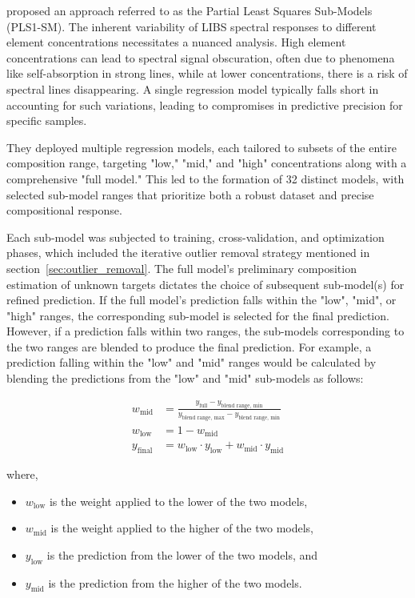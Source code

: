\citet{andersonImprovedAccuracyQuantitative2017} proposed an approach referred to as the Partial Least Squares Sub-Models (PLS1-SM).
The inherent variability of LIBS spectral responses to different element concentrations necessitates a nuanced analysis.
High element concentrations can lead to spectral signal obscuration, often due to phenomena like self-absorption in strong lines, while at lower concentrations, there is a risk of spectral lines disappearing.
A single regression model typically falls short in accounting for such variations, leading to compromises in predictive precision for specific samples.

They deployed multiple regression models, each tailored to subsets of the entire composition range, targeting "low," "mid," and "high" concentrations along with a comprehensive "full model." This led to the formation of 32 distinct models, with selected sub-model ranges that prioritize both a robust dataset and precise compositional response.

Each sub-model was subjected to training, cross-validation, and optimization phases, which included the iterative outlier removal strategy mentioned in section~\ref{sec:outlier_removal}.
The full model's preliminary composition estimation of unknown targets dictates the choice of subsequent sub-model(s) for refined prediction.
If the full model's prediction falls within the "low", "mid", or "high" ranges, the corresponding sub-model is selected for the final prediction.
However, if a prediction falls within two ranges, the sub-models corresponding to the two ranges are blended to produce the final prediction.
For example, a prediction falling within the "low" and "mid" ranges would be calculated by blending the predictions from the "low" and "mid" sub-models as follows:

\begin{align*}
w_{\text{mid}} &= \frac{y_{\text{full}}-y_{\text{blend range, min}}}{y_{\text{blend range, max}} - y_{\text{blend range, min}}} \\
w_{\text{low}} &= 1 - w_{\text{mid}} \\
y_{\text{final}} &= w_{\text{low}}\cdot y_{\text{low}} + w_{\text{mid}}\cdot y_{\text{mid}}
\end{align*}

where,

\begin{itemize}
    \item $w_{\text{low}}$ is the weight applied to the lower of the two models,
    \item $w_{\text{mid}}$ is the weight applied to the higher of the two models,
    \item $y_{\text{low}}$ is the prediction from the lower of the two models, and
    \item $y_{\text{mid}}$ is the prediction from the higher of the two models.
\end{itemize}

